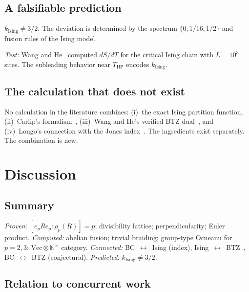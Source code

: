 \documentclass[aps,prl,twocolumn,superscriptaddress,showpacs]{revtex4-2}
\begin{document}
\subsection{A falsifiable prediction}

\begin{prediction}
$k_{\mathrm{Ising}} \neq 3/2$. The deviation is determined by the spectrum $\{0, 1/16, 1/2\}$ and fusion rules of the Ising model.
\end{prediction}

\textit{Test:} Wang and He~\cite{WangHe2026} computed $dS/dT$ for the critical Ising chain with $L = 10^3$ sites. The subleading behavior near $T_{\mathrm{HP}}$ encodes $k_{\mathrm{Ising}}$.

\subsection{The calculation that does not exist}

No calculation in the literature combines: (i)~the exact Ising partition function, (ii)~Carlip's formalism~\cite{Carlip2000}, (iii)~Wang and He's verified BTZ dual~\cite{WangHe2026}, and (iv)~Longo's connection with the Jones index~\cite{Longo2001}. The ingredients exist separately. The combination is new.

\section{Discussion}
\label{sec:discussion}

\subsection{Summary}

\textit{Proven:} $[e_p R e_p : \rho_p(R)] = p$; divisibility lattice; perpendicularity; Euler product. \textit{Computed:} abelian fusion; trivial braiding; group-type Ocneanu for $p=2,3$; $\mathrm{Vec} \otimes \mathbb{N}^\times$ category. \textit{Connected:} BC~$\leftrightarrow$~Ising (index), Ising~$\leftrightarrow$~BTZ~\cite{WangHe2026}, BC~$\leftrightarrow$~BTZ (conjectural). \textit{Predicted:} $k_{\mathrm{Ising}} \neq 3/2$.

\subsection{Relation to concurrent work}
\end{document}
